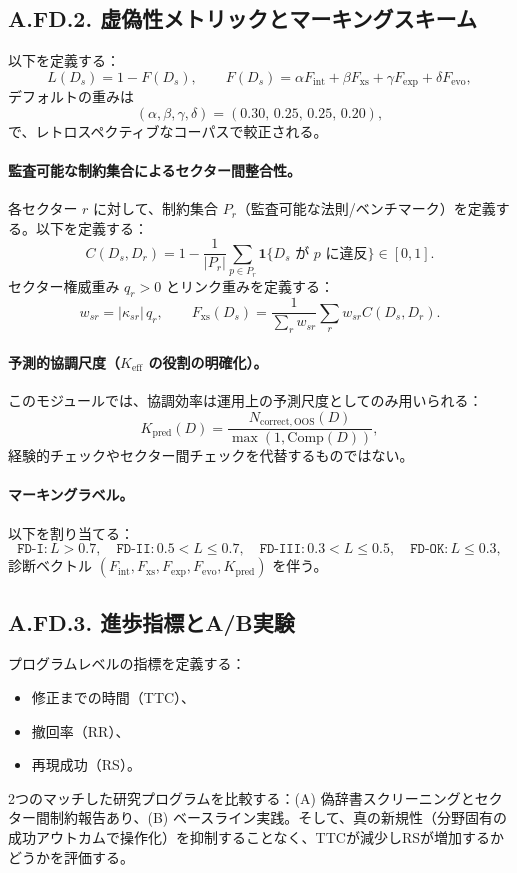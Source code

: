 \documentclass[13pt,a4paper]{ltjsarticle}
\newcommand{\Keff}{K_{\mathrm{eff}}}
\newcommand{\Kpred}{K_{\mathrm{pred}}}
\newcommand{\abs}[1]{\left|#1\right|}
\newcommand{\indicator}{\mathbf{1}}
\begin{document}
	\subsection*{A.FD.2. 虚偽性メトリックとマーキングスキーム}
	以下を定義する：
	\[
	L(D_s)=1-F(D_s),\qquad
	F(D_s)=\alpha F_{\mathrm{int}}+\beta F_{\mathrm{xs}}+\gamma F_{\mathrm{exp}}+\delta F_{\mathrm{evo}},
	\]
	デフォルトの重みは
	\[
	(\alpha,\beta,\gamma,\delta)=(0.30,\,0.25,\,0.25,\,0.20),
	\]
	で、レトロスペクティブなコーパスで較正される。
	
	\paragraph{監査可能な制約集合によるセクター間整合性。}
	各セクター $r$ に対して、制約集合 $P_r$（監査可能な法則/ベンチマーク）を定義する。以下を定義する：
	\[
	C(D_s,D_r)=1-\frac{1}{|P_r|}\sum_{p\in P_r}\indicator\{D_s\text{ が }p\text{ に違反}\}\in[0,1].
	\]
	セクター権威重み $q_r>0$ とリンク重みを定義する：
	\[
	w_{sr}=\abs{\kappa_{sr}}\,q_r,\qquad
	F_{\mathrm{xs}}(D_s)=\frac{1}{\sum_r w_{sr}}\sum_{r}w_{sr}C(D_s,D_r).
	\]
	
	\paragraph{予測的協調尺度（$\Keff$ の役割の明確化）。}
	このモジュールでは、協調効率は運用上の予測尺度としてのみ用いられる：
	\[
	\Kpred(D)=\frac{N_{\mathrm{correct,OOS}}(D)}{\max(1,\mathrm{Comp}(D))},
	\]
	経験的チェックやセクター間チェックを代替するものではない。
	
	\paragraph{マーキングラベル。}
	以下を割り当てる：
	\[
	\texttt{FD-I}: L>0.7,\quad
	\texttt{FD-II}: 0.5<L\le0.7,\quad
	\texttt{FD-III}: 0.3<L\le0.5,\quad
	\texttt{FD-OK}: L\le0.3,
	\]
	診断ベクトル $(F_{\mathrm{int}},F_{\mathrm{xs}},F_{\mathrm{exp}},F_{\mathrm{evo}},\Kpred)$ を伴う。
	
	\subsection*{A.FD.3. 進歩指標とA/B実験}
	プログラムレベルの指標を定義する：
	\begin{itemize}[leftmargin=*]
		\item 修正までの時間（TTC）、
		\item 撤回率（RR）、
		\item 再現成功（RS）。
	\end{itemize}
	2つのマッチした研究プログラムを比較する：(A) 偽辞書スクリーニングとセクター間制約報告あり、(B) ベースライン実践。そして、真の新規性（分野固有の成功アウトカムで操作化）を抑制することなく、TTCが減少しRSが増加するかどうかを評価する。
	
\end{document}
